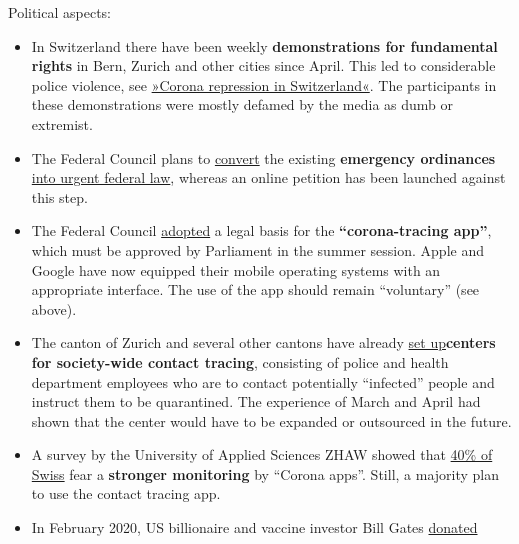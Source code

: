 Political aspects:

\begin{itemize}
\tightlist
\item
  In Switzerland there have been weekly \textbf{demonstrations for
  fundamental rights} in Bern, Zurich and other cities since April. This
  led to considerable police violence, see
  \href{https://swprs.org/corona-repression-in-der-schweiz/}{»Corona
  repression in Switzerland«}. The participants in these demonstrations
  were mostly defamed by the media as dumb or extremist.
\item
  The Federal Council plans to
  \href{https://www.zeitpunkt.ch/petition-gegen-umwandlung-der-notverordnungen-dringliches-bundesrecht-lanciert}{convert}
  the existing \textbf{emergency ordinances}
  \href{https://www.zeitpunkt.ch/petition-gegen-umwandlung-der-notverordnungen-dringliches-bundesrecht-lanciert}{into
  urgent federal law}, whereas an online petition has been launched
  against this step.
\item
  The Federal Council
  \href{https://www.republik.ch/2020/05/21/haftstrafe-ohne-straftat-lauber-soll-abgesetzt-werden-und-bald-nicht-mehr-alles-in-butter}{adopted}
  a legal basis for the \textbf{``corona-tracing app''}, which must be
  approved by Parliament in the summer session. Apple and Google have
  now equipped their mobile operating systems with an appropriate
  interface. The use of the app should remain ``voluntary'' (see above).
\item
  The canton of Zurich and several other cantons have already
  \href{https://www.nzz.ch/zuerich/coronavirus-in-zuerich-contact-tracing-ist-gut-angelaufen-ld.1556846}{set
  up}\textbf{centers for society-wide contact tracing}, consisting of
  police and health department employees who are to contact potentially
  ``infected'' people and instruct them to be quarantined. The
  experience of March and April had shown that the center would have to
  be expanded or outsourced in the future.
\item
  A survey by the University of Applied Sciences ZHAW showed that
  \href{https://www.zhaw.ch/de/medien/medienmitteilungen/detailansicht-medienmitteilung/event-news/viele-schweizer-fuerchten-ueberwachung-durch-contact-tracing-app/}{40\%
  of Swiss} fear a \textbf{stronger monitoring} by ``Corona apps''.
  Still, a majority plan to use the contact tracing app.
\item
  In February 2020, US billionaire and vaccine investor Bill Gates
  \href{https://www.christoph-pfluger.ch/2020/05/23/der-groesste-impfstoff-investor-schenkt-der-swissmedic-900000-dollar/}{donated
}
\end{itemize}
